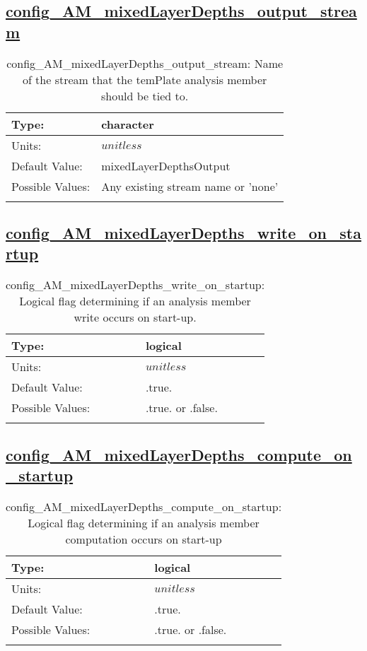 \subsection[config\_AM\_mixedLayerDepths\_output\_stream]{\hyperref[sec:nm_tab_AM_mixedLayerDepths]{config\_AM\_mixedLayerDepths\_output\_stream}}
\label{subsec:nm_sec_config_AM_mixedLayerDepths_output_stream}
\begin{center}
\begin{longtable}{| p{2.0in} || p{4.0in} |}
    \hline
    Type: & character \\
    \hline
    Units: & $unitless$ \\
    \hline
    Default Value: & mixedLayerDepthsOutput \\
    \hline
    Possible Values: & Any existing stream name or 'none' \\
    \hline
    \caption{config\_AM\_mixedLayerDepths\_output\_stream: Name of the stream that the temPlate analysis member should be tied to.}
\end{longtable}
\end{center}
\subsection[config\_AM\_mixedLayerDepths\_write\_on\_startup]{\hyperref[sec:nm_tab_AM_mixedLayerDepths]{config\_AM\_mixedLayerDepths\_write\_on\_startup}}
\label{subsec:nm_sec_config_AM_mixedLayerDepths_write_on_startup}
\begin{center}
\begin{longtable}{| p{2.0in} || p{4.0in} |}
    \hline
    Type: & logical \\
    \hline
    Units: & $unitless$ \\
    \hline
    Default Value: & .true. \\
    \hline
    Possible Values: & .true. or .false. \\
    \hline
    \caption{config\_AM\_mixedLayerDepths\_write\_on\_startup: Logical flag determining if an analysis member write occurs on start-up.}
\end{longtable}
\end{center}
\subsection[config\_AM\_mixedLayerDepths\_compute\_on\_startup]{\hyperref[sec:nm_tab_AM_mixedLayerDepths]{config\_AM\_mixedLayerDepths\_compute\_on\_startup}}
\label{subsec:nm_sec_config_AM_mixedLayerDepths_compute_on_startup}
\begin{center}
\begin{longtable}{| p{2.0in} || p{4.0in} |}
    \hline
    Type: & logical \\
    \hline
    Units: & $unitless$ \\
    \hline
    Default Value: & .true. \\
    \hline
    Possible Values: & .true. or .false. \\
    \hline
    \caption{config\_AM\_mixedLayerDepths\_compute\_on\_startup: Logical flag determining if an analysis member computation occurs on start-up}
\end{longtable}
\end{center}
